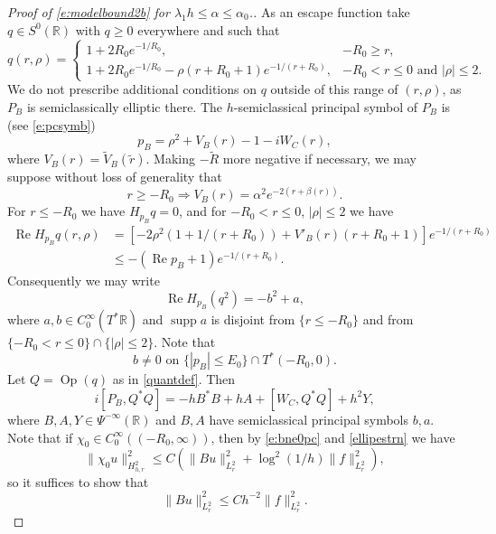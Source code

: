 \documentclass[reqno, 12pt]{amsart}
\newcommand \R {\mathbb{R}}
\newcommand \Oh {\mathcal{O}}
\DeclareMathOperator \re {Re}
\DeclareMathOperator \supp {supp}
\DeclareMathOperator \Op {Op}
\theoremstyle{definition}
\numberwithin{equation}{section}
\numberwithin{prop}{section}
\numberwithin{figure}{section}
\begin{document}
\begin{proof}[Proof of \eqref{e:modelbound2b} for $\lambda_1 h \le \alpha \le \alpha_0$.]
As an escape function take $q \in S^0(\R)$ with $q\ge 0$ everywhere and such that
\[
q(r,\rho) = \begin{cases} 1 + 2 R_0e^{-1/R_0}, & -R_0 \ge r, \\ 1 + 2 R_0e^{-1/R_0} -\rho (r+R_0+1) e^{-1/(r+R_0)}, & -R_0 < r \le 0 \textrm{ and } |\rho|\le2. \end{cases}
\]
We do not prescribe additional conditions on $q$ outside of this range of $(r,\rho)$, as $P_B$ is semiclassically elliptic there. The $h$-semiclassical principal symbol of $P_B$ is (see \eqref{e:pcsymb})
\[
p_B = \rho^2 +  V_B( r) - 1 - i W_C( r),
\]
where $V_B(r) = \widetilde V_B(\tilde r)$. %
Making $-\widetilde R$ more negative if necessary, we may suppose without loss of generality that
\[
r \ge -R_0 \Longrightarrow V_B(r) = \alpha^2 e^{-2(r + \beta(r))}.
\]
For $r \le -R_0$ we have $H_{p_B} q = 0$,  and for $-R_0 < r \le 0$, $|\rho| \le 2$ we have
\[\begin{split}
\re H_{p_B} q(r,\rho) &= \left[-2\rho^2 (1 + 1/(r+R_0) ) + V'_B(r)(r+R_0+1) \right]e^{-1/(r+R_0)} \\
&\le -(\re p_B +1)e^{-1/(r+R_0)}.
\end{split}\]
Consequently we may write
\[
\re H_{p_B} (q^2) = -b^2 + a,
\]
where $a,b \in C^\infty_0(T^*\R)$ and $\supp a$ is disjoint from $\{r \le -R_0\}$ and from $\{-R_0<r\le 0\} \cap \{|\rho|\le2\}$. Note that 
\begin{equation}\label{e:bne0pc}
b \ne 0 \textrm{ on } \{|p_B| \le E_0\} \cap T^*(-R_0,0).
\end{equation}
Let $Q = \Op(q)$ as in \eqref{quantdef}.
Then
\begin{equation}\label{e:pcposcom}
i[P_B,Q^*Q] = -h B^*B + hA + [W_C,Q^*Q] + h^2Y,
\end{equation}
where $B,A,Y \in \Psi^{-\infty}(\R)$ and $B,A$ have semiclassical principal symbols $b,a$. Note that if $\chi_0 \in C_0^\infty((-R_0,\infty))$, then by \eqref{e:bne0pc} and \eqref{ellipestrn} we have
\begin{equation}\label{e:chi0pc}
\| \chi_0 u\|^2_{H^2_{h,r}} \le C (\|Bu\|^2_{L^2_r} + \log^2(1/h)\|f\|^2_{L^2_r}),
\end{equation}
so it suffices to show that
\begin{equation}\label{e:bpc}
\|Bu\|^2_{L^2_r} \le  C h^{-2} \|f\|^2_{L^2_r}.

\end{equation}
\end{proof}
\end{document}
